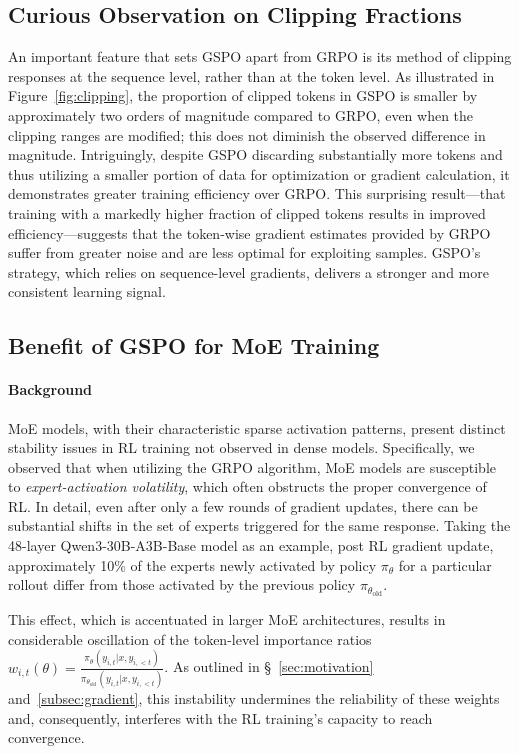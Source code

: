 \subsection{Curious Observation on Clipping Fractions}

An important feature that sets GSPO apart from GRPO is its method of clipping responses at the sequence level, rather than at the token level. As illustrated in Figure~\ref{fig:clipping}, the proportion of clipped tokens in GSPO is smaller by approximately two orders of magnitude compared to GRPO, even when the clipping ranges are modified; this does not diminish the observed difference in magnitude. Intriguingly, despite GSPO discarding substantially more tokens and thus utilizing a smaller portion of data for optimization or gradient calculation, it demonstrates greater training efficiency over GRPO. This surprising result—that training with a markedly higher fraction of clipped tokens results in improved efficiency—suggests that the token-wise gradient estimates provided by GRPO suffer from greater noise and are less optimal for exploiting samples. GSPO’s strategy, which relies on sequence-level gradients, delivers a stronger and more consistent learning signal.

\subsection{Benefit of GSPO for MoE Training}
\label{subsec:routing_replay}

\paragraph{Background}
MoE models, with their characteristic sparse activation patterns, present distinct stability issues in RL training not observed in dense models. Specifically, we observed that when utilizing the GRPO algorithm, MoE models are susceptible to \textit{expert-activation volatility}, which often obstructs the proper convergence of RL. In detail, even after only a few rounds of gradient updates, there can be substantial shifts in the set of experts triggered for the same response. Taking the 48-layer Qwen3-30B-A3B-Base model as an example, post RL gradient update, approximately 10\% of the experts newly activated by policy $\pi_{\theta}$ for a particular rollout differ from those activated by the previous policy $\pi_{\theta_\text{old}}$. 

This effect, which is accentuated in larger MoE architectures, results in considerable oscillation of the token-level importance ratios $w_{i,t}(\theta) = \frac{ \pi_{\theta} (y_{i,t} | x, y_{i,<t}) }{ \pi_{\theta_\text{old}} (y_{i,t} | x,y_{i,<t})}$. As outlined in \S~\ref{sec:motivation} and~\ref{subsec:gradient}, this instability undermines the reliability of these weights and, consequently, interferes with the RL training's capacity to reach convergence.

